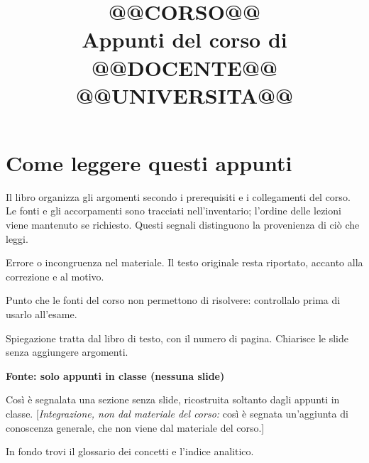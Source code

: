 \documentclass[11pt,a4paper,openany]{book}
\title{\Huge\bfseries @@CORSO@@\\[0.6em]\Large\mdseries Appunti del corso di @@DOCENTE@@\\ @@UNIVERSITA@@}
\author{}
\date{}
\newcommand{\ultimocapitolo}{}
\newcommand{\ultimasezione}{}
\newcommand{\soloappunti}{\par\noindent\textcolor{fonte}{\small\sffamily\bfseries Fonte: solo appunti in classe (nessuna slide)}\par\smallskip}
\newcommand{\integrazione}[1]{\textcolor{sintesi}{\small[\emph{Integrazione, non dal materiale del corso:} #1]}}
\begin{document}
\frontmatter
\maketitle

\chapter*{Come leggere questi appunti}
Il libro organizza gli argomenti secondo i prerequisiti e i collegamenti del corso. Le fonti e gli accorpamenti sono tracciati nell'inventario; l'ordine delle lezioni viene mantenuto se richiesto. Questi segnali distinguono la provenienza di ciò che leggi.

\begin{correzione}
Errore o incongruenza nel materiale. Il testo originale resta riportato, accanto alla correzione e al motivo.
\end{correzione}
\begin{dubbio}
Punto che le fonti del corso non permettono di risolvere: controllalo prima di usarlo all'esame.
\end{dubbio}
\begin{dallibro}
Spiegazione tratta dal libro di testo, con il numero di pagina. Chiarisce le slide senza aggiungere argomenti.
\end{dallibro}
\soloappunti
\noindent Così è segnalata una sezione senza slide, ricostruita soltanto dagli appunti in classe. \integrazione{così è segnata un'aggiunta di conoscenza generale, che non viene dal materiale del corso.}

\medskip
\noindent In fondo trovi il glossario dei concetti e l'indice analitico.

\tableofcontents

\mainmatter

% 

\backmatter

\clearpage\gdef\ultimocapitolo{Indice analitico}\gdef\ultimasezione{}
\printindex[indice]
\end{document}
